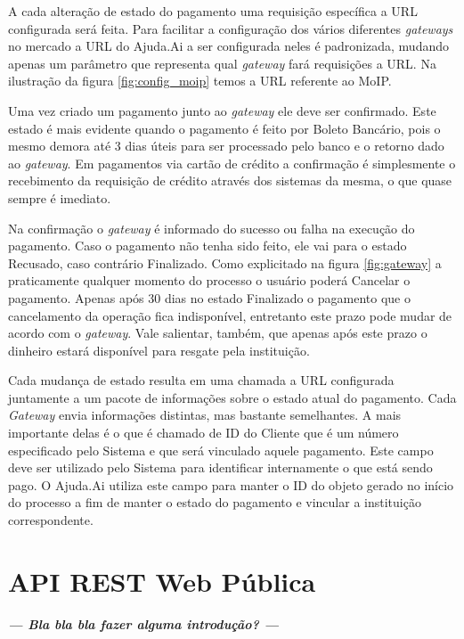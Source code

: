 A cada alteração de estado do pagamento uma requisição específica a URL configurada será feita. Para facilitar a configuração dos vários diferentes \emph{gateways} no mercado a URL do Ajuda.Ai a ser configurada neles é padronizada, mudando apenas um parâmetro que representa qual \emph{gateway} fará requisições a URL. Na ilustração da figura \ref{fig:config_moip} temos a URL referente ao MoIP.

Uma vez criado um pagamento junto ao \emph{gateway} ele deve ser confirmado. Este estado é mais evidente quando o pagamento é feito por Boleto Bancário, pois o mesmo demora até 3 dias úteis para ser processado pelo banco e o retorno dado ao \emph{gateway}. Em pagamentos via cartão de crédito a confirmação é simplesmente o recebimento da requisição de crédito através dos sistemas da mesma, o que quase sempre é imediato.

Na confirmação o \emph{gateway} é informado do sucesso ou falha na execução do pagamento. Caso o pagamento não tenha sido feito, ele vai para o estado Recusado, caso contrário Finalizado. Como explicitado na figura \ref{fig:gateway} a praticamente qualquer momento do processo o usuário poderá Cancelar o pagamento. Apenas após 30 dias no estado Finalizado o pagamento que o cancelamento da operação fica indisponível, entretanto este prazo pode mudar de acordo com o \emph{gateway}. Vale salientar, também, que apenas após este prazo o dinheiro estará disponível para resgate pela instituição.

Cada mudança de estado resulta em uma chamada a URL configurada juntamente a um pacote de informações sobre o estado atual do pagamento. Cada \emph{Gateway} envia informações distintas, mas bastante semelhantes. A mais importante delas é o que é chamado de ID do Cliente que é um número especificado pelo Sistema e que será vinculado aquele pagamento. Este campo deve ser utilizado pelo Sistema para identificar internamente o que está sendo pago. O Ajuda.Ai utiliza este campo para manter o ID do objeto  gerado no início do processo a fim de manter o estado do pagamento e vincular a instituição correspondente.





\section{API REST Web Pública} \label{sec:ajudaai:api}

\textbf{\textit{--- Bla bla bla fazer alguma introdução? ---}}

